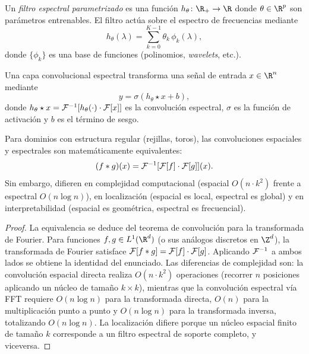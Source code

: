 \begin{definition}
\label{def:grids:spectral-filter}
Un \emph{filtro espectral parametrizado} es una funci\'on
$h_\theta \colon \R_+ \to \R$ donde $\theta \in \R^p$ son par\'ametros
entrenables. El filtro act\'ua sobre el espectro de frecuencias mediante
\[
  h_\theta(\lambda) = \sum_{k=0}^{K-1} \theta_k\, \phi_k(\lambda),
\]
donde $\{\phi_k\}$ es una base de funciones (polinomios, \emph{wavelets}, etc.).
\end{definition}

\begin{definition}
\label{def:grids:spectral-layer}
Una capa convolucional espectral transforma una se\~nal de entrada $x \in \R^n$
mediante
\[
  y = \sigma(h_\theta \star x + b),
\]
donde $h_\theta \star x = \mathcal{F}^{-1}[h_\theta(\cdot) \cdot \mathcal{F}[x]]$ es la
convoluci\'on espectral, $\sigma$ es la funci\'on de activaci\'on y $b$ es el
t\'ermino de sesgo.
\end{definition}

\begin{theorem}
\label{thm:grids:spatial-spectral}
Para dominios con estructura regular (rejillas, toros), las convoluciones
espaciales y espectrales son matem\'aticamente equivalentes:
\[
  (f * g)(x) = \mathcal{F}^{-1}[\mathcal{F}[f] \cdot \mathcal{F}[g]](x).
\]
Sin embargo, difieren en complejidad computacional (espacial $O(n \cdot k^2)$
frente a espectral $O(n \log n)$), en localizaci\'on (espacial es local,
espectral es global) y en interpretabilidad (espacial es geom\'etrica,
espectral es frecuencial).
\end{theorem}

\begin{proof}
La equivalencia se deduce del teorema de convoluci\'on para la transformada de
Fourier. Para funciones $f, g \in L^1(\R^d)$ (o sus an\'alogos discretos en
$\Z^d$), la transformada de Fourier satisface
$\mathcal{F}[f * g] = \mathcal{F}[f] \cdot \mathcal{F}[g]$. Aplicando $\mathcal{F}^{-1}$ a ambos lados se
obtiene la identidad del enunciado. Las diferencias de complejidad son: la
convoluci\'on espacial directa realiza $O(n \cdot k^2)$ operaciones (recorrer
$n$ posiciones aplicando un n\'ucleo de tama\~no $k \times k$), mientras que la
convoluci\'on espectral v\'ia FFT requiere $O(n \log n)$ para la transformada
directa, $O(n)$ para la multiplicaci\'on punto a punto y $O(n \log n)$ para la
transformada inversa, totalizando $O(n \log n)$. La localizaci\'on difiere
porque un n\'ucleo espacial finito de tama\~no $k$ corresponde a un filtro
espectral de soporte completo, y viceversa.
\end{proof}

